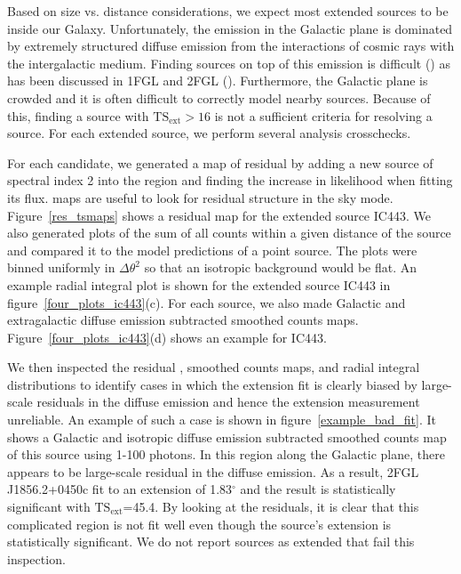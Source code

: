 \documentclass[12pt,preprint]{aastex}
\newcommand{\gev}{\text{GeV}\xspace}
\newcommand{\tsext}{{\ensuremath{\text{TS}_{\text{ext}}}}\xspace}
\newcommand{\ts}{\text{TS}\xspace}
\renewcommand{\deg}{\ensuremath{^\circ}\xspace}
\begin{document}
Based on size vs. distance considerations,
we expect most extended sources to be inside our Galaxy.  Unfortunately, the \gev emission
in the Galactic plane is dominated by extremely structured 
diffuse emission from the interactions of cosmic rays with the
intergalactic medium.  Finding sources on top of this emission is difficult
(\cite{first_diffuse_paper}) as has been discussed in 1FGL and 2FGL
(\cite{first_cat,second_cat}).  Furthermore, the Galactic plane is crowded
and it is often difficult to correctly model nearby sources.  Because of this,
finding a source with $\tsext>16$ is not a sufficient
criteria for resolving a source. For each extended source,
we perform several analysis crosschecks.

For each candidate, we generated a map of residual \ts by adding a new
source of spectral index 2 into the region and finding the increase in
likelihood when fitting its flux. \ts maps are useful to look for residual
structure in the sky mode.  Figure~\ref{res_tsmaps} shows a residual \ts
map for the extended source IC443.  We also generated plots of the sum of
all counts within a given distance of the source and compared it to the
model predictions of a point source.  The plots were binned uniformly
in $\Delta \theta^2$ so that an isotropic background would be flat.
An example radial integral plot is shown for the extended source IC443
in figure~\ref{four_plots_ic443}(c).  For each source, we also made
Galactic and extragalactic diffuse emission subtracted smoothed counts
maps. Figure~\ref{four_plots_ic443}(d) shows an example for IC443.

We then inspected the residual \ts, smoothed counts maps, and radial
integral distributions to identify cases in which the extension fit
is clearly biased by large-scale residuals in the diffuse emission
and hence the extension measurement unreliable.  An example of such a
case is shown in figure~\ref{example_bad_fit}. It shows a Galactic and
isotropic diffuse emission subtracted smoothed counts map of this source
using 1-100 \gev photons.  In this region along the Galactic plane,
there appears to be large-scale residual in the diffuse emission. As
a result, 2FGL\,J1856.2+0450c fit to an extension of 1.83\deg and the
result is statistically significant with \tsext=45.4.  By looking at
the residuals, it is clear that this complicated region is not fit well
even though the source's extension is statistically significant. We do
not report sources as extended that fail this inspection.
\end{document}
